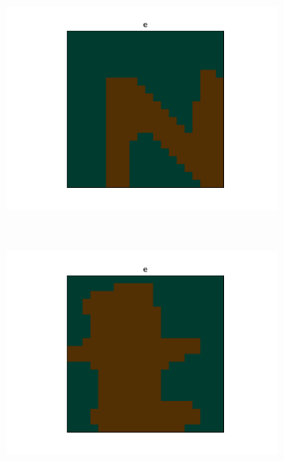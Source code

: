 \documentclass[../main.tex]{subfiles}
\begin{document}
\begin{figure}
\begin{subfigure}[t]{0.15\textwidth}
        \includegraphics[width=\textwidth]{figures/ex/n_2.pdf}
        \label{fig:gull}
    \end{subfigure}
    ~ 
    \begin{subfigure}[t]{0.15\textwidth}
        \includegraphics[width=\textwidth]{figures/ex/n_3.pdf}
        \label{fig:gull}
    \end{subfigure}
    ~ 
    \begin{subfigure}[t]{0.15\textwidth}

\end{subfigure}
\end{figure}
\end{document}
